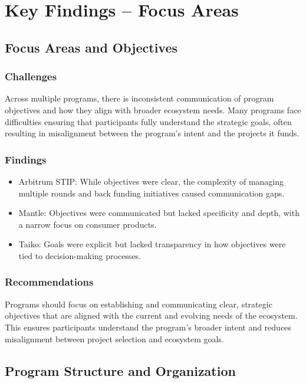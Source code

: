 \documentclass[a4,10pt]{article}
\begin{document}
\section{Key Findings -- Focus Areas}\label{sec_9}

\subsection{Focus Areas and Objectives}\label{sec_9.1}

\subsubsection{Challenges}\label{sec_9.1.1}

Across multiple programs, there is inconsistent communication of program objectives and how they align with broader ecosystem needs. Many programs face difficulties ensuring that participants fully understand the strategic goals, often resulting in misalignment between the program's intent and the projects it funds.

\subsubsection{Findings}\label{sec_9.1.2}
\begin{itemize}
    \item Arbitrum STIP: While objectives were clear, the complexity of managing multiple rounds and back funding initiatives caused communication gaps.
    \item Mantle: Objectives were communicated but lacked specificity and depth, with a narrow focus on consumer products.
    \item Taiko: Goals were explicit but lacked transparency in how objectives were tied to decision-making processes.
\end{itemize}

\subsubsection{Recommendations}\label{sec_9.1.3}
Programs should focus on establishing and communicating clear, strategic objectives that are aligned with the current and evolving needs of the ecosystem. This ensures participants understand the program's broader intent and reduces misalignment between project selection and ecosystem goals.

\subsection{Program Structure and Organization}\label{sec_9.2}
\end{document}
